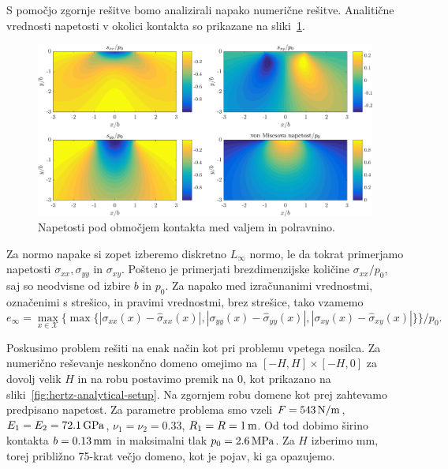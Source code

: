 \documentclass[12pt,a4paper,twoside]{article}
\theoremstyle{definition} %
\theoremstyle{plain} %
\numberwithin{equation}{section}
\newcommand{\X}{\mathcal{X}}
\begin{document}
S pomočjo zgornje rešitve bomo analizirali napako numerične rešitve.
Analitične vrednosti napetosti v okolici kontakta so prikazane na sliki~\ref{fig:hertz-analytical}.

\begin{figure}[!h]
  \centering
  \includegraphics[width=\textwidth]{images/hertzian_analytical.png}
  \caption{Napetosti pod območjem kontakta med valjem in polravnino.}
  \label{fig:hertz-analytical}
\end{figure}

Za normo napake si zopet izberemo diskretno $L_\infty$ normo, le da tokrat
primerjamo napetosti $\sigma_{xx}, \sigma_{yy}$ in $\sigma_{xy}$. Pošteno je primerjati
brezdimenzijske količine $\sigma_{xx}/p_0$, saj so neodvisne od izbire $b$ in $p_0$.
Za napako med izračunanimi vrednostmi, označenimi s strešico, in pravimi vrednostmi, brez strešice,
tako vzamemo
\begin{equation}
  e_\infty = \max_{x\in \X} \{\max\{|\sigma_{xx}(x)-\hat{\sigma}_{xx}(x)|,
                                   |\sigma_{yy}(x)-\hat{\sigma}_{yy}(x)|,
                                   |\sigma_{xy}(x)-\hat{\sigma}_{xy}(x)| \}\} / p_0.
\end{equation}

Poskusimo problem rešiti na enak način kot pri problemu vpetega nosilca.
Za numerično reševanje neskončno domeno omejimo na $[-H, H] \times [-H, 0]$ za dovolj velik $H$
in na robu postavimo premik na 0, kot prikazano na sliki~\ref{fig:hertz-analytical-setup}. Na
zgornjem robu domene kot prej zahtevamo predpisano napetost. Za parametre problema smo vzeli $F =
\unit[543]{N/m}$, $E_1 = E_2 = \unit[72.1]{GPa}$, $\nu_1 = \nu_2 = 0.33$, $R_1 = R = \unit[1]{m}$.
Od tod dobimo širino kontakta $b = \unit[0.13]{mm}$ in maksimalni tlak $p_0 = \unit[2.6]{MPa}$.
Za $H$ izberimo \unit[10]{mm}, torej približno 75-krat večjo domeno, kot je pojav, ki ga opazujemo.
\end{document}
